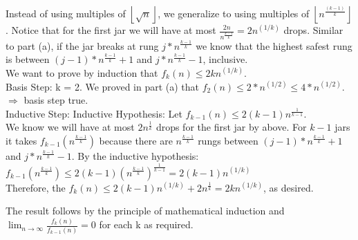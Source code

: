 \documentclass[11pt]{article}
\begin{document}
Instead of using multiples of $\left \lfloor{\sqrt{n}}\right \rfloor$, we generalize to using multiples of $\left \lfloor{n^{\frac{(k - 1)}{k}}}\right \rfloor$. Notice that for the first jar we will have at most $\frac{2n}{n^{\frac{k - 1}{k}}} = 2n^{(1/k)}$ drops. Similar to part (a), if the jar breaks at rung $j * n^{\frac{k - 1}{k}}$ we know that the highest safest rung is between $(j - 1) * n^{\frac{k - 1}{k}} + 1$ and $j * n^{\frac{k - 1}{k}} - 1$, inclusive.\\

We want to prove by induction that $f_k(n) \leq 2kn^{(1/k)}$.\\
Basis Step: k = 2. We proved in part (a) that $f_2(n) \leq 2 * n^{(1/2)} \leq 4 * n^{(1/2)}$. $\Rightarrow$ basis step true.\\
Inductive Step: \newline
Inductive Hypothesis: Let $f_{k - 1}(n) \leq 2(k - 1)n^{\frac{1}{k - 1}}$.\\
We know we will have at most $2n^{\frac{1}{k}}$ drops for the first jar by above. For $k - 1$ jars it takes $f_{k - 1}(n^{\frac{k - 1}{k}})$ because there are $n^{\frac{k - 1}{k}}$ rungs between $(j - 1) * n^{\frac{k - 1}{k}} + 1$ and $j * n^{\frac{k - 1}{k}} - 1$. By the inductive hypothesis:\\

$f_{k - 1}(n^{\frac{k - 1}{k}}) \leq 2(k - 1)(n^{\frac{k - 1}{k}})^{\frac{1}{k - 1}} = 2(k - 1)n^{(1/k)}$\\

Therefore, the $f_k(n) \leq 2(k - 1)n^{(1/k)} + 2n^{\frac{1}{k}} = 2kn^{(1/k)}$, as desired.

The result follows by the principle of mathematical induction and $\lim_{n\to\infty} \frac{f_k(n)}{f_{k - 1}(n)} = 0$ for each k as required.\\
\end{document}
